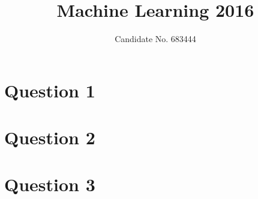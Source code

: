 \documentclass{tufte-handout}
\title{Machine Learning 2016}
\author{Candidate No. 683444}
\theoremstyle{definition}
\numberwithin{definition}{section}
\theoremstyle{plain}
\numberwithin{prop}{section}
\theoremstyle{plain}
\numberwithin{lemma}{section}
\theoremstyle{plain}
\numberwithin{corollary}{section}
\begin{document}
\maketitle

\section{Question 1}\label{sec:q-1}


\newcommand{\sectionbreak}{\clearpage}
\section{Question 2}\label{sec:q-2}


\section{Question 3}\label{sec:q-3}

\end{document}
